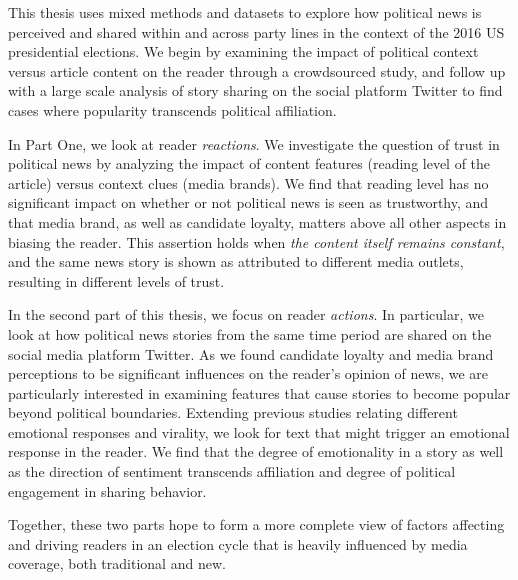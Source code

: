 \def\abstractpage{\cleardoublepage
\begin{center}{\large{\bf \@title} \\
by \\
\@author \\[\baselineskip]}
\par
\def\baselinestretch{1}\@normalsize
Submitted to the \@department, \\
\@school \\
on \@thesisdate, in partial fulfillment of the \\
requirements for the \@degreeword\ of \\
\@degree
\end{center}
\par
\begin{abstract}}
This thesis uses mixed methods and datasets to explore how political news is perceived and shared within and across party lines in the context of the 2016 US presidential elections. We begin by examining the impact of political context versus article content on the reader through a crowdsourced study, and follow up with a large scale analysis of story sharing on the social platform Twitter to find cases where popularity transcends political affiliation.
 
In Part One, we look at reader \emph{reactions}. We investigate the question of trust in political news by analyzing the impact of content features (reading level of the article) versus context clues (media brands). We find that reading level has no significant impact on whether or not political news is seen as trustworthy, and that media brand, as well as candidate loyalty, matters above all other aspects in biasing the reader. This assertion holds when \emph{the content itself remains constant}, and the same news story is shown as attributed to different media outlets, resulting in different levels of trust. 

In the second part of this thesis, we focus on reader \emph{actions}.  In particular, we look at how political news stories from the same time period are shared on the social media platform Twitter. As we found candidate loyalty and media brand perceptions to be significant influences on the reader's opinion of news, we are particularly interested in examining features that cause stories to become popular beyond political boundaries. Extending previous studies relating different emotional responses and virality, we look for text that might trigger an emotional response in the reader. We find that the degree of emotionality in a story as well as the direction of sentiment transcends affiliation and degree of political engagement in sharing behavior. 

Together, these two parts hope to form a more complete view of factors affecting and driving readers in an election cycle that is heavily influenced by media coverage, both traditional and new.





\afterpage{\blankpage}

 